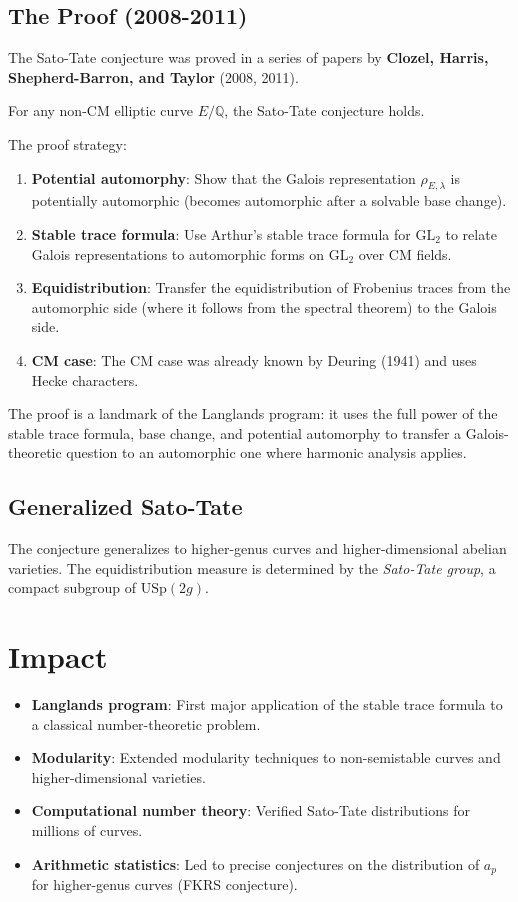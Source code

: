 \subsection{The Proof (2008-2011)}
The Sato-Tate conjecture was proved in a series of papers by \textbf{Clozel, Harris, Shepherd-Barron, and Taylor} (2008, 2011).

\begin{theorem}
For any non-CM elliptic curve $E/\mathbb{Q}$, the Sato-Tate conjecture holds.
\end{theorem}

The proof strategy:
\begin{enumerate}
\item \textbf{Potential automorphy}: Show that the Galois representation $\rho_{E,\lambda}$ is potentially automorphic (becomes automorphic after a solvable base change).
\item \textbf{Stable trace formula}: Use Arthur's stable trace formula for $\text{GL}_2$ to relate Galois representations to automorphic forms on $\text{GL}_2$ over CM fields.
\item \textbf{Equidistribution}: Transfer the equidistribution of Frobenius traces from the automorphic side (where it follows from the spectral theorem) to the Galois side.
\item \textbf{CM case}: The CM case was already known by Deuring (1941) and uses Hecke characters.
\end{enumerate}

\begin{highlightbox}
The proof is a landmark of the Langlands program: it uses the full power of the stable trace formula, base change, and potential automorphy to transfer a Galois-theoretic question to an automorphic one where harmonic analysis applies.
\end{highlightbox}

\subsection{Generalized Sato-Tate}
The conjecture generalizes to higher-genus curves and higher-dimensional abelian varieties. The equidistribution measure is determined by the \emph{Sato-Tate group}, a compact subgroup of $\text{USp}(2g)$.

\section{Impact}
\begin{itemize}
\item \textbf{Langlands program}: First major application of the stable trace formula to a classical number-theoretic problem.
\item \textbf{Modularity}: Extended modularity techniques to non-semistable curves and higher-dimensional varieties.
\item \textbf{Computational number theory}: Verified Sato-Tate distributions for millions of curves.
\item \textbf{Arithmetic statistics}: Led to precise conjectures on the distribution of $a_p$ for higher-genus curves (FKRS conjecture).
\end{itemize}

